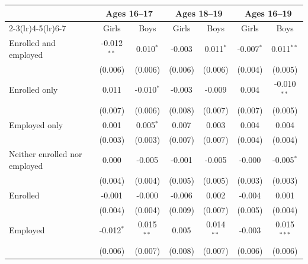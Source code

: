 \begin{tabular}{lcccccc}
\toprule
 & \multicolumn{2}{c}{Ages 16--17} & \multicolumn{2}{c}{Ages 18--19} & \multicolumn{2}{c}{Ages 16--19} \\
\cmidrule(lr){2-3}\cmidrule(lr){4-5}\cmidrule(lr){6-7}
 & Girls & Boys & Girls & Boys & Girls & Boys \\
\midrule
Enrolled and employed & -0.012$^{**}$ & 0.010$^{*}$ & -0.003 & 0.011$^{*}$ & -0.007$^{*}$ & 0.011$^{**}$ \\
 & (0.006) & (0.006) & (0.006) & (0.006) & (0.004) & (0.005) \\
Enrolled only & 0.011 & -0.010$^{*}$ & -0.003 & -0.009 & 0.004 & -0.010$^{**}$ \\
 & (0.007) & (0.006) & (0.008) & (0.007) & (0.007) & (0.005) \\
Employed only & 0.001 & 0.005$^{*}$ & 0.007 & 0.003 & 0.004 & 0.004 \\
 & (0.003) & (0.003) & (0.007) & (0.007) & (0.004) & (0.004) \\
Neither enrolled nor employed & 0.000 & -0.005 & -0.001 & -0.005 & -0.000 & -0.005$^{*}$ \\
 & (0.004) & (0.004) & (0.005) & (0.005) & (0.003) & (0.003) \\
Enrolled & -0.001 & -0.000 & -0.006 & 0.002 & -0.004 & 0.001 \\
 & (0.004) & (0.004) & (0.009) & (0.007) & (0.005) & (0.004) \\
Employed & -0.012$^{*}$ & 0.015$^{**}$ & 0.005 & 0.014$^{**}$ & -0.003 & 0.015$^{***}$ \\
 & (0.006) & (0.007) & (0.008) & (0.007) & (0.006) & (0.006) \\
\bottomrule
\end{tabular}
